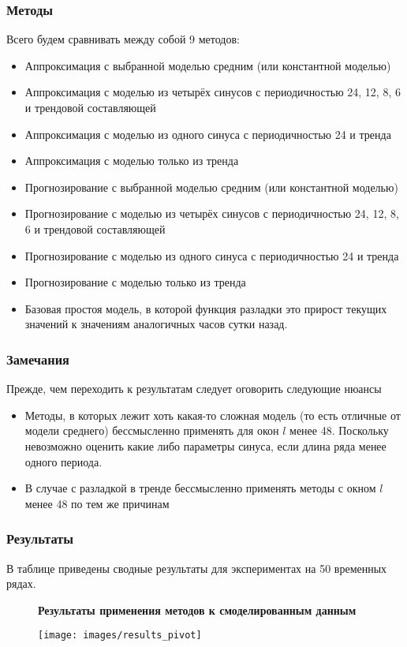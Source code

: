 \documentclass[intlimits, 9pt, unicode]{beamer}
\begin{document}
\begin{frame}
\frametitle{Методы}

Всего будем сравнивать между собой 9 методов:
\begin{itemize}
	\item Аппроксимация с выбранной моделью средним (или константной моделью)
	\item Аппроксимация с моделью из четырёх синусов с периодичностью 24, 12, 8, 6 и трендовой составляющей
	\item Аппроксимация с моделью из одного синуса с периодичностью 24 и тренда
	\item Аппроксимация с моделью только из тренда
	\item Прогнозирование с выбранной моделью средним (или константной моделью)
	\item Прогнозирование с моделью из четырёх синусов с периодичностью 24, 12, 8, 6 и трендовой составляющей
	\item Прогнозирование с моделью из одного синуса с периодичностью 24 и тренда
	\item Прогнозирование с моделью только из тренда
	\item Базовая простоя модель, в которой функция разладки это прирост текущих значений к значениям аналогичных часов сутки назад.
\end{itemize}

\end{frame}


\begin{frame}
\frametitle{Замечания}

Прежде, чем переходить к результатам следует оговорить следующие нюансы
\begin{itemize}
	\item Методы, в которых лежит хоть какая-то сложная модель (то есть отличные от модели среднего) бессмысленно применять для окон $l$ менее 48. Поскольку невозможно оценить какие либо параметры синуса, если длина ряда менее одного периода. 
	\item В случае с разладкой в тренде бессмысленно применять методы  с окном $l$ менее 48 по тем же причинам
\end{itemize}

\end{frame}


\begin{frame}
\frametitle{Результаты}

В таблице приведены сводные результаты для экспериментах на 50 временных рядах.

\begin{figure}
\textbf{Результаты применения методов к смоделированным данным}\par\medskip
\texttt{[image: images/results\_pivot]}
\end{figure}


\end{frame}
\end{document}

